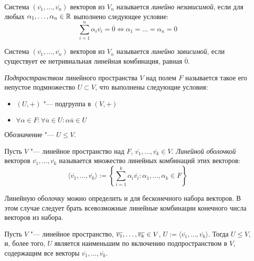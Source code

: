     \begin{reminder}
        Система $(\overline{v_1}, \dots, \overline{v_n})$ векторов из $V_n$ называется \textit{линейно независимой}, если для любых $\alpha_1, \dotsc, \alpha_n \in \mathbb{R}$ выполнено следующее условие:
        \[\sum_{i = 1}^{n}\alpha_i\overline{v_i} = \overline{0} \Leftrightarrow \alpha_1 = \dots = \alpha_n = 0\]
    
        Система $(\overline{v_1}, \dots, \overline{v_n})$ векторов из $V_n$ называется \textit{линейно зависимой}, если существует ее нетривиальная линейная комбинация, равная $\overline{0}$.
    \end{reminder}
    
    \begin{definition}
    	\textit{Подпространством} линейного пространства $V$ над полем $F$ называется такое его непустое подмножество $U \subset V$, что выполнены следующие условия:
    	\begin{itemize}
    		\item $(U, +)$ "--- подгруппа в $(V, +)$
    		\item $\forall \alpha \in F: \forall \overline{u} \in U: \alpha\overline{u} \in U$
    	\end{itemize}
    	
    	Обозначение "--- $U \le V$.
    \end{definition}
    
    \begin{definition}
    	Пусть $V$ "--- линейное пространство над $F$, $\overline{v_1}, \dots, \overline{v_k} \in V$. \textit{Линейной оболочкой} векторов $\overline{v_1}, \dots, \overline{v_k}$ называется множество линейных комбинаций этих векторов:
    	\[\langle\overline{v_1}, \dots, \overline{v_k}\rangle := \left\{\sum_{i = 1}^{k}\alpha_i\overline{v_i}: \alpha_1, \dots, \alpha_k \in F\right\}\]
    \end{definition}
    
    \begin{note}
    	Линейную оболочку можно определить и для бесконечного набора векторов. В этом случае следует брать всевозможные линейные комбинации конечного числа векторов из набора.
    \end{note}
    
    \begin{proposition}
    	Пусть $V$ "--- линейное пространство, $\overline{v_1}, \dots, \overline{v_k} \hm{\in} V$, $U := \langle\overline{v_1}, \dots, \overline{v_k}\rangle$. Тогда $U \le V$, и, более того, $U$ является наименьшим по включению подпространством в $V$, содержащим все векторы $\overline{v_1}, \dotsc, \overline{v_k}$.
    \end{proposition}
    
